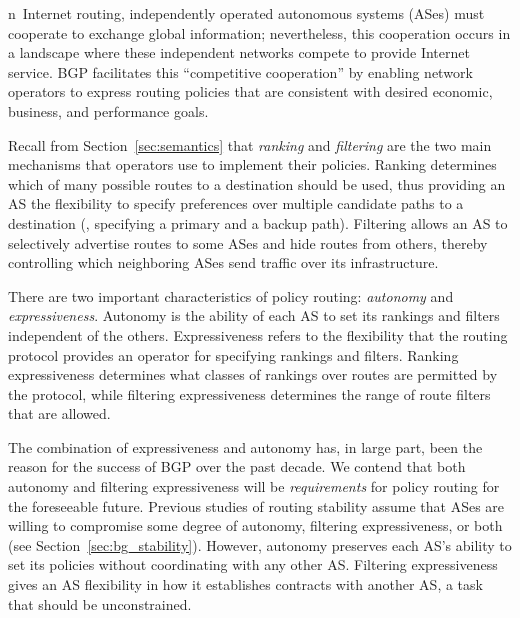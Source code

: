

n~Internet routing, independently operated autonomous systems (ASes)
must cooperate to exchange global information; nevertheless, this
cooperation occurs in a landscape where these independent networks
compete to provide Internet service.  BGP
facilitates this ``competitive cooperation'' by enabling network
operators to express routing policies that are consistent with desired
economic, business, and performance goals.

Recall from Section~\ref{sec:semantics} that {\em ranking} and {\em
filtering} are the two main mechanisms that operators use to implement
their policies.  Ranking determines which of many possible routes to a
destination should be used, thus providing an AS the flexibility to specify
preferences over multiple candidate paths to a destination (\eg,
specifying a primary and a backup path).  Filtering allows an AS to
selectively advertise routes to some ASes and hide routes
from others, thereby controlling which neighboring ASes
send traffic over its infrastructure.

There are two important characteristics of policy routing: {\em
autonomy} and {\em expressiveness}.  Autonomy is the ability of each
AS to set its rankings and filters independent of the others.
Expressiveness refers to the flexibility
that the routing protocol provides an operator for specifying rankings and
filters.  Ranking expressiveness determines what classes of rankings
over routes are permitted by the protocol, while filtering
expressiveness determines the range of route filters that are allowed.

The combination of expressiveness and autonomy has, in large part, been
the reason for the success of BGP over the past decade.  We contend that
both autonomy and filtering expressiveness will be {\em requirements}
for policy routing for the foreseeable future.  Previous studies of
routing stability assume that ASes are willing to compromise some degree
of autonomy, filtering expressiveness, or both (see
Section~\ref{sec:bg_stability}).  However, autonomy preserves each AS's
ability to set its policies without coordinating with any other AS.
Filtering expressiveness gives an AS flexibility in how it establishes
contracts with another AS, a task that should be unconstrained.

